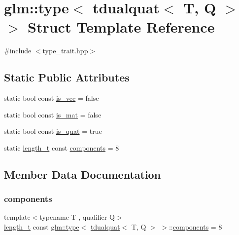 \hypertarget{structglm_1_1type_3_01tdualquat_3_01_t_00_01_q_01_4_01_4}{}\section{glm\+:\+:type$<$ tdualquat$<$ T, Q $>$ $>$ Struct Template Reference}
\label{structglm_1_1type_3_01tdualquat_3_01_t_00_01_q_01_4_01_4}


{\ttfamily \#include $<$type\+\_\+trait.\+hpp$>$}

\subsection*{Static Public Attributes}
\begin{DoxyCompactItemize}
\item 
static bool const \mbox{\hyperlink{structglm_1_1type_3_01tdualquat_3_01_t_00_01_q_01_4_01_4_ab10de3a5cc6cb536a7464fbe07aadeb4}{is\+\_\+vec}} = false
\item 
static bool const \mbox{\hyperlink{structglm_1_1type_3_01tdualquat_3_01_t_00_01_q_01_4_01_4_a733a4f2d4dda8bcbf732ec5a8123ecc5}{is\+\_\+mat}} = false
\item 
static bool const \mbox{\hyperlink{structglm_1_1type_3_01tdualquat_3_01_t_00_01_q_01_4_01_4_a2205290f32121fe4f7f058c53671359e}{is\+\_\+quat}} = true
\item 
static \mbox{\hyperlink{namespaceglm_a090a0de2260835bee80e71a702492ed9}{length\+\_\+t}} const \mbox{\hyperlink{structglm_1_1type_3_01tdualquat_3_01_t_00_01_q_01_4_01_4_a781f382733b9a6e596b675488b2e3e74}{components}} = 8
\end{DoxyCompactItemize}


\subsection{Member Data Documentation}
\mbox{\label{structglm_1_1type_3_01tdualquat_3_01_t_00_01_q_01_4_01_4_a781f382733b9a6e596b675488b2e3e74}} 
\subsubsection{\texorpdfstring{components}{components}}
{\footnotesize\ttfamily template$<$typename T , qualifier Q$>$ \\
\mbox{\hyperlink{namespaceglm_a090a0de2260835bee80e71a702492ed9}{length\+\_\+t}} const \mbox{\hyperlink{structglm_1_1type}{glm\+::type}}$<$ \mbox{\hyperlink{structglm_1_1tdualquat}{tdualquat}}$<$ T, Q $>$ $>$\+::\mbox{\hyperlink{_s_d_l__opengl__glext_8h_a3824c86dfa50d23068c74eafb87375c2}{components}} = 8\hspace{0.3cm}{\ttfamily [static]}}

